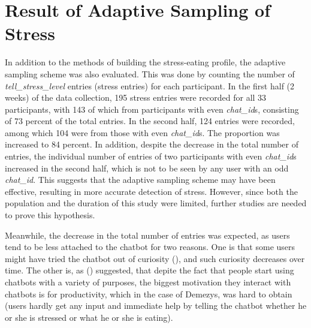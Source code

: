 \bigskip\bigskip
\section{Result of Adaptive Sampling of Stress}

In addition to the methods of building the stress-eating profile, the adaptive sampling scheme was also evaluated. This was done by counting the number of \emph{tell\_stress\_level} entries (stress entries) for each participant. In the first half (2 weeks) of the data collection, 195 stress entries were recorded for all 33 participants, with 143 of which from participants with even \emph{chat\_id}s, consisting of 73 percent of the total entries. In the second half, 124 entries were recorded, among which 104 were from those with even \emph{chat\_id}s. The proportion was increased to 84 percent. In addition, despite the decrease in the total number of entries, the individual number of entries of two participants with even \emph{chat\_id}s increased in the second half, which is not to be seen by any user with an odd \emph{chat\_id}. This suggests that the adaptive sampling scheme may have been effective, resulting in more accurate detection of stress. However, since both the population and the duration of this study were limited, further studies are needed to prove this hypothesis.

Meanwhile, the decrease in the total number of entries was expected, as users tend to be less attached to the chatbot for two reasons. One is that some users might have tried the chatbot out of curiosity (\cite{47_curiosity}), and such curiosity decreases over time. The other is, as \citeauthor{48_why_chatbot} (\citeyear{48_why_chatbot}) suggested, that depite the fact that people start using chatbots with a variety of purposes, the biggest motivation they interact with chatbots is for productivity, which in the case of Demezys, was hard to obtain (users hardly get any input and immediate help by telling the chatbot whether he or she is stressed or what he or she is eating).
